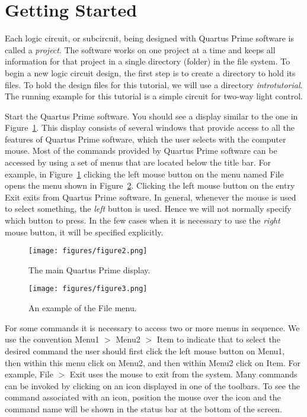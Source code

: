 \section{Getting Started}

\noindent 
Each logic circuit, or subcircuit, being designed with Quartus Prime software is
called a {\it project}. The software works on one project at a time
and keeps all information for that project in a single directory (folder) in
the file system.
To begin a new logic circuit design, the first step is
to create a directory to hold its files. 
To hold the design files for this tutorial, we will use a directory 
{\it introtutorial}.
The running example for this tutorial is a simple circuit for two-way light control.

Start the Quartus Prime software. You should see a display
similar to the one in Figure~\ref{fig:2}. This display consists of several windows that 
provide access to all the features of 
Quartus Prime software, which the user selects with the computer mouse.
Most of the commands provided by Quartus Prime software can be accessed by using a set of
menus that are located below the title bar. For
example, in Figure~\ref{fig:2} clicking the left mouse button on the menu
named {\sf File} opens the menu shown in Figure~\ref{fig:3}. Clicking the
left mouse button on the entry {\sf Exit} exits
from Quartus Prime software. In general, whenever the mouse is used to select
something, the {\it left} button is used. Hence we will not normally
specify which button to press. In the few cases when it is
necessary to use the {\it right} mouse button, it will be specified explicitly. 

\begin{figure}[H]
   \begin{center}
      \texttt{[image: figures/figure2.png]}
   \caption{The main Quartus Prime display.} 
	 \label{fig:2}
	 \end{center}
\end{figure}

\begin{figure}[H]
   \begin{center}
      \texttt{[image: figures/figure3.png]}
   \caption{An example of the File menu.} 
	 \label{fig:3}
	 \end{center}
\end{figure}

\newpage
For some commands it is necessary to access two or more menus in sequence.
We use the convention {\sf Menu1 $>$ Menu2 $>$ Item} to indicate that 
to select the desired command 
the user should first click the left mouse button on {\sf Menu1}, then 
within this menu click on {\sf Menu2}, and then
within {\sf Menu2} click on {\sf Item}. For example, 
{\sf File $>$ Exit} uses the mouse to exit from the system.
Many commands can be invoked by clicking on an icon displayed in 
one of the toolbars. To see the command associated with an icon, position the mouse
over the icon and the command name will be shown in the status bar at the bottom of the screen.
